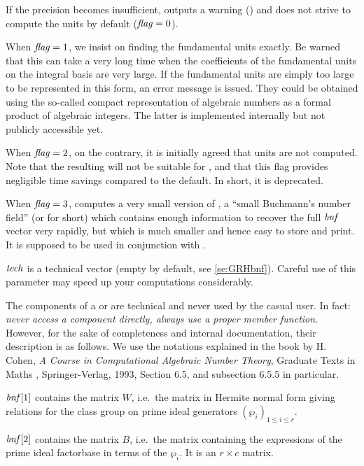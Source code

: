 If the precision becomes insufficient,  outputs a warning
() and does not strive to compute
the units by default ($\hbox{\it f\kern0pt lag\/}=0$).

   When $\hbox{\it f\kern0pt lag\/}=1$, we insist on finding the fundamental units exactly. Be
warned that this can take a very long time when the coefficients of the
fundamental units on the integral basis are very large. If the fundamental
units are simply too large to be represented in this form, an error message
is issued. They could be obtained using the so-called compact representation
of algebraic numbers as a formal product of algebraic integers. The latter is
implemented internally but not publicly accessible yet.

   When $\hbox{\it f\kern0pt lag\/}=2$, on the contrary, it is initially agreed that units are not
computed. Note that the resulting  will not be suitable for
, and that this flag provides negligible time savings
compared to the default. In short, it is deprecated.

   When $\hbox{\it f\kern0pt lag\/}=3$, computes a very small version of , a ``small
Buchmann's number field'' (or  for short) which contains enough
information to recover the full $\hbox{\it bnf\/}$ vector very rapidly, but which is
much smaller and hence easy to store and print. It is supposed to be used in
conjunction with .

$\hbox{\it tech\/}$ is a technical vector (empty by default, see \ref{se:GRHbnf}).
Careful use of this parameter may speed up your computations considerably.

\smallskip

The components of a  or  are technical and never used by
the casual user. In fact: \emph{never access a component directly, always use
a proper member function.} However, for the sake of completeness and internal
documentation, their description is as follows. We use the notations
explained in the book by H. Cohen, \emph{A Course in Computational Algebraic
Number Theory}, Graduate Texts in Maths , Springer-Verlag, 1993,
Section 6.5, and subsection 6.5.5 in particular.

$\hbox{\it bnf\/}[1]$ contains the matrix $W$, i.e.~the matrix in Hermite normal
form giving relations for the class group on prime ideal generators
$(\wp_i)_{1\le i\le r}$.

$\hbox{\it bnf\/}[2]$ contains the matrix $B$, i.e.~the matrix containing the
expressions of the prime ideal factorbase in terms of the $\wp_i$. It is an
$r\times c$ matrix.

